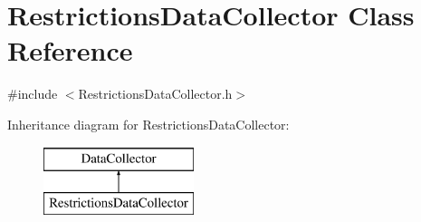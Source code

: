 \hypertarget{classRestrictionsDataCollector}{}\section{Restrictions\+Data\+Collector Class Reference}
\label{classRestrictionsDataCollector}


{\ttfamily \#include $<$Restrictions\+Data\+Collector.\+h$>$}

Inheritance diagram for Restrictions\+Data\+Collector\+:\begin{figure}[H]
\begin{center}
\leavevmode
\includegraphics[height=2.000000cm]{classRestrictionsDataCollector}
\end{center}
\end{figure}
